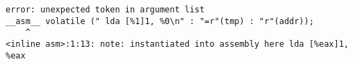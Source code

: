 
\noindent\begin{minipage}{\textwidth}
\begin{lstlisting}[language={}]
error: unexpected token in argument list
__asm__ volatile (" lda [%1]1, %0\n" : "=r"(tmp) : "r"(addr));
	^
<inline asm>:1:13: note: instantiated into assembly here lda [%eax]1, %eax
\end{lstlisting}
\end{minipage}